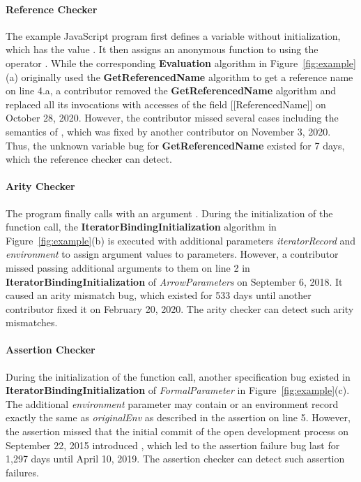 \paragraph{Reference Checker} The example JavaScript program first defines a
variable  without initialization, which has the value .
It then assigns an anonymous function to  using the operator .
While the corresponding \textbf{Evaluation} algorithm in Figure~\ref{fig:example}(a) originally
used the \textbf{GetReferencedName} algorithm to get a reference name on line 4.a,
a contributor removed the \textbf{GetReferencedName} algorithm and replaced all its
invocations with accesses of the field [[ReferencedName]] on October 28, 2020.
However, the contributor missed several cases including the semantics of
, which was fixed by another contributor on November 3, 2020.
Thus, the unknown variable bug for \textbf{GetReferencedName} existed for 7 days,
which the reference checker can detect.

\paragraph{Arity Checker} The program finally calls  with an argument .
During the initialization of the function call, the \textbf{IteratorBindingInitialization}
algorithm in Figure~\ref{fig:example}(b) is executed with additional parameters \textit{iteratorRecord} and
\textit{environment} to assign argument values to parameters.
However, a contributor missed passing additional arguments to them on line 2 in
\textbf{IteratorBindingInitialization} of \textit{ArrowParameters} on September 6, 2018.
It caused an arity mismatch bug, which existed for 533 days until another
contributor fixed it on February 20, 2020. The arity checker can detect such arity mismatches.

\paragraph{Assertion Checker} During the initialization of the function call,
another specification bug existed in \textbf{IteratorBindingInitialization} of
\textit{FormalParameter} in Figure~\ref{fig:example}(c).  The additional \textit{environment} parameter may
contain  or an environment record exactly the same as
\textit{originalEnv} as described in the assertion on line 5.
However, the assertion missed that the initial commit
of the open development process on September 22, 2015 introduced
, which led to the assertion failure bug last for 1,297 days until April 10, 2019.
The assertion checker can detect such assertion failures.


